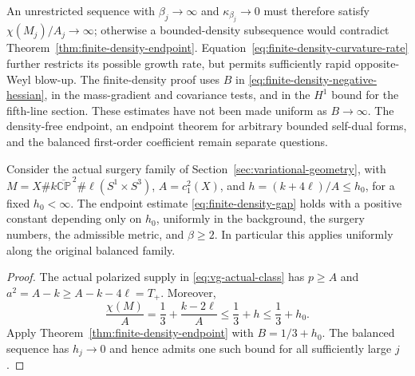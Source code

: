 An unrestricted sequence with $\beta_j\to\infty$ and
$\kappa_{\beta_j}\to0$ must therefore satisfy
$\chi(M_j)/A_j\to\infty$; otherwise a bounded-density subsequence
would contradict Theorem~\ref{thm:finite-density-endpoint}.
Equation~\eqref{eq:finite-density-curvature-rate} further restricts
its possible growth rate, but permits sufficiently rapid opposite-Weyl
blow-up.  The finite-density proof uses $B$ in
\eqref{eq:finite-density-negative-hessian}, in the mass-gradient and
covariance tests, and in the $H^1$ bound for the fifth-line section.
These estimates have not been made uniform as $B\to\infty$.
The density-free endpoint, an endpoint theorem for arbitrary bounded
self-dual forms, and the balanced first-order coefficient remain
separate questions.

\begin{corollary}
\label{cor:finite-density-original-family}
Consider the actual surgery family of
Section~\ref{sec:variational-geometry}, with
$M=X\#k\overline{\mathbb{CP}}^{\,2}\#\ell(S^1\times S^3)$,
$A=c_1^2(X)$, and $h=(k+4\ell)/A\le h_0$, for a fixed $h_0<\infty$.
The endpoint estimate \eqref{eq:finite-density-gap} holds with a
positive constant depending only on $h_0$, uniformly in the background,
the surgery numbers, the admissible metric, and $\beta\ge2$.
In particular this applies uniformly along the original balanced family.
\end{corollary}
\begin{proof}
The actual polarized supply in \eqref{eq:vg-actual-class} has
$p\ge A$ and $a^2=A-k\ge A-k-4\ell=T_+$. Moreover,
\[
 \frac{\chi(M)}A=\frac13+\frac{k-2\ell}{A}
       \le\frac13+h\le\frac13+h_0.
\]
Apply Theorem~\ref{thm:finite-density-endpoint} with
$B=1/3+h_0$. The balanced sequence has $h_j\to0$ and hence admits
one such bound for all sufficiently large $j$.
\end{proof}
